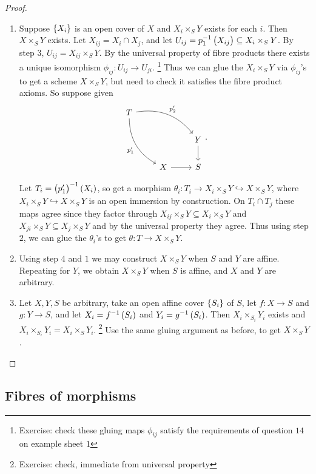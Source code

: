 \begin{proof}
\begin{enumerate}[leftmargin=0.5in, label=Step \arabic*.]
\item Suppose $ \cbr{X_i} $ is an open cover of $ X $ and $ X_i \times_S Y $ exists for each $ i $. Then $ X \times_S Y $ exists. Let $ X_{ij} = X_i \cap X_j $, and let $ U_{ij} = p_1^{-1}\br{X_{ij}} \subseteq X_i \times_S Y $. By step $ 3 $, $ U_{ij} = X_{ij} \times_S Y $. By the universal property of fibre products there exists a unique isomorphism $ \phi_{ij} : U_{ij} \to U_{ji} $. \footnote{Exercise: check these gluing maps $ \phi_{ij} $ satisfy the requirements of question $ 14 $ on example sheet $ 1 $} Thus we can glue the $ X_i \times_S Y $ via $ \phi_{ij} $'s to get a scheme $ X \times_S Y $, but need to check it satisfies the fibre product axioms. So suppose given
$$
\begin{tikzcd}
T \arrow[bend left=30]{drr}{p_2'} \arrow[bend right=30]{ddr}[swap]{p_1'} & & \\
& & Y \arrow{d} \\
& X \arrow{r} & S
\end{tikzcd}.
$$

\pagebreak

Let $ T_i = \br{p_1'}^{-1}\br{X_i} $, so get a morphism $ \theta_i : T_i \to X_i \times_S Y \hookrightarrow X \times_S Y $, where $ X_i \times_S Y \hookrightarrow X \times_S Y $ is an open immersion by construction. On $ T_i \cap T_j $ these maps agree since they factor through $ X_{ij} \times_S Y \subseteq X_i \times_S Y $ and $ X_{ji} \times_S Y \subseteq X_j \times_S Y $ and by the universal property they agree. Thus using step $ 2 $, we can glue the $ \theta_i $'s to get $ \theta : T \to X \times_S Y $.
\item Using step $ 4 $ and $ 1 $ we may construct $ X \times_S Y $ when $ S $ and $ Y $ are affine. Repeating for $ Y $, we obtain $ X \times_S Y $ when $ S $ is affine, and $ X $ and $ Y $ are arbitrary.
\item Let $ X, Y, S $ be arbitrary, take an open affine cover $ \cbr{S_i} $ of $ S $, let $ f : X \to S $ and $ g : Y \to S $, and let $ X_i = f^{-1}\br{S_i} $ and $ Y_i = g^{-1}\br{S_i} $. Then $ X_i \times_{S_i} Y_i $ exists and $ X_i \times_{S_i} Y_i = X_i \times_S Y_i $. \footnote{Exercise: check, immediate from universal property} Use the same gluing argument as before, to get $ X \times_S Y $.
\end{enumerate}
\end{proof}

\subsection{Fibres of morphisms}

